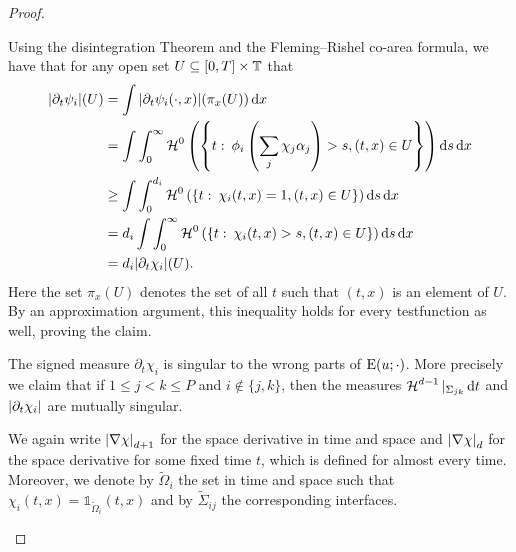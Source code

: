 \begin{proof}
\begin{description}[wide=0pt]
		Using the disintegration Theorem \cite[Thm.~3.103]{ambrosio_fusco_pallara_functions_of_bv_and_free_discontinuity_problems} and the Fleming--Rishel co-area formula, we have that for any open set $ U \subseteq [ 0 , T ] \times \operatorname{\mathbb{T}} $ that
		\begin{align*}
			\abs{
				\partial_{ t } \psi_{ i }
			} ( U ) 
			& =
			\int
				\abs{ 
					\partial_{ t } \psi_{ i } ( \cdot , x )
				} ( \pi_{ x } ( U ) ) 
			\dd{ x }
			\\
			& =
			\int
				\int_{ 0 }^{ \infty }
					\operatorname{\mathcal{H}}^{ 0 } \left(
						\left\{
							t 
							\, \colon \,
							\phi_{ i } 
							\left( \sum_{ j } \chi_{ j } \alpha_{ j } \right) > s,
							( t, x ) \in U
						\right\}
					\right)
				\dd{ s }
			\dd{ x }
			\\
			& \geq
			\int
				\int_{ 0 }^{ d_{ i } }
					\operatorname{\mathcal{H}}^{ 0 }
						\left(
							\left\{
								t 
								\, \colon \,
								\chi_{ i } ( t , x ) = 1,
								( t, x ) \in U
							\right\}
						\right)
				\dd{ s }
			\dd{ x }
			\\
			& =
			d_{ i }
			\int
				\int_{ 0 }^{ \infty }
					\operatorname{\mathcal{H}}^{ 0 } \left(
						\left\{
							t 
							\, \colon \,
							\chi_{ i } ( t , x ) > s , ( t , x ) \in U
						\right\}
					\right)
				\dd{ s }
			\dd{ x }
			\\
			& =
			d_{ i }
			\abs{ \partial_{ t } \chi_{ i } } ( U ).
		\end{align*}
		Here the set $ \pi_{ x } ( U ) $ denotes the set of all $ t $ such that $ ( t , x ) $ is an element of $ U $.
		By an approximation argument, this inequality holds for every testfunction as well, proving the claim.
		
		\item[Step 3:] The signed measure $ \partial_{ t } \chi_{ i } $ is singular to the wrong parts of $ \operatorname{E} ( u ; \cdot ) $. More precisely we claim that if $ 1 \leq j < k \leq P $ and $ i \notin \{ j , k \} $, then the measures 
		$ \operatorname{\mathcal{H}}^{ d - 1 } |_{ \Sigma_{ j k } } \dd{ t } $ and $ \abs{ \partial_{ 
		t } \chi_{ i } } $ are mutually singular.
		
		We again write $ \abs{ \nabla \chi }_{ d + 1 } $ for the space derivative in time and space and $ \abs{ \nabla \chi }_{ d } $ for the space derivative for some fixed time $ t $, which is defined for almost every time. Moreover, we denote by $ \tilde{ \Omega }_{ i } $ the set in time and space such that
		$ \chi_{ i } ( t , x ) = \mathds{ 1 }_{ \tilde{ \Omega }_{ i } } ( t , x ) $
		and by $ \tilde{ \Sigma }_{ i j } $ the corresponding interfaces.
		

\end{description}
\end{proof}
